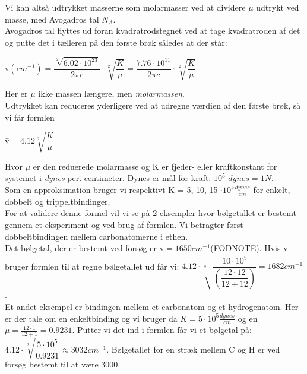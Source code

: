 Vi kan altså udtrykket masserne som molarmasser ved at dividere $\mu$ udtrykt ved masse, med Avogadros tal $N_A$.
\\

Avogadros tal flyttes ud foran kvadratrodstegnet ved at tage kvadratroden af det og putte det i tælleren på den første brøk således at der står:

\begin{center}
\={v}$(cm^{-1})=\dfrac{\sqrt[2]{6.02 \cdot 10^{23}}}{2 \pi c} \cdot \sqrt[2]{\dfrac{K}{\mu}} = \dfrac{7.76 \cdot 10^{11}}{2 \pi c} \cdot \sqrt[2]{\dfrac{K}{\mu}}$
\end{center}

Her er $\mu$ ikke massen længere, men \emph{molarmassen}.
\\

Udtrykket kan reduceres yderligere ved at udregne værdien af den  første brøk, så vi får formlen

\begin{center}
\={v}$=4.12 \sqrt[2]{\dfrac{K}{\mu}}$
\end{center}

Hvor $\mu$ er den reduerede molarmasse og K er fjeder- eller kraftkonstant for systemet i \emph{dynes} per. centimeter. Dynes er mål for kraft. $10^5$  $dynes = 1N$.
\\

Som en approksimation bruger vi respektivt K = 5, 10, 15 $\cdot 10^5 \frac{dynes}{cm}$ for enkelt, dobbelt og trippeltbindinger.
\\

For at validere denne formel vil vi se på 2 eksempler hvor bølgetallet er bestemt gennem et eksperiment og ved brug af formlen. Vi betragter først dobbeltbindingen mellem carbonatomerne i ethen.
\\

Det bølgetal, der er bestemt ved forsøg er \={v}$=1650cm^{-1}$(FODNOTE). Hvis vi bruger formlen til at regne bølgetallet ud får vi: $4.12 \cdot \sqrt[2]{\dfrac{10 \cdot 10^5}{(\dfrac{12 \cdot 12}{12 +12})}} = 1682 cm^{-1}$. 
\\

Et andet eksempel er bindingen mellem et carbonatom og et hydrogenatom. Her er der tale om en enkeltbinding og vi bruger da $K=5 \cdot 10^5 \frac{dynes}{cm}$ og en $\mu = \frac{12 \cdot 1}{12 + 1} = 0.9231$. Putter vi det ind i formlen får vi et bølgetal på: $4.12 \cdot \sqrt[2]{\dfrac{5 \cdot 10^5}{0.9231}} \approx 3032 cm^{-1}$. Bølgetallet for en stræk mellem C og H er ved forsøg bestemt til at være 3000. 
\\

